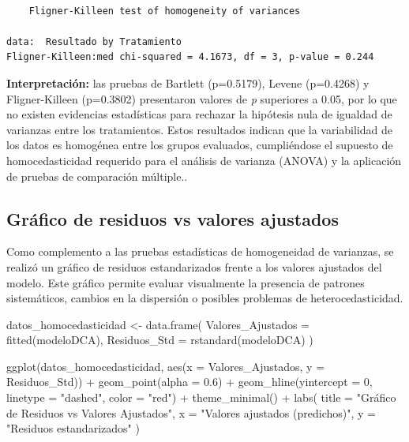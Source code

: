 \documentclass[
  spanish,
  letterpaper,
  DIV=11,
  numbers=noendperiod]{scrreprt}
\newenvironment{Shaded}{\begin{snugshade}}{\end{snugshade}}
\newcommand{\AttributeTok}[1]{\textcolor[rgb]{0.40,0.45,0.13}{#1}}
\newcommand{\DecValTok}[1]{\textcolor[rgb]{0.68,0.00,0.00}{#1}}
\newcommand{\FloatTok}[1]{\textcolor[rgb]{0.68,0.00,0.00}{#1}}
\newcommand{\FunctionTok}[1]{\textcolor[rgb]{0.28,0.35,0.67}{#1}}
\newcommand{\NormalTok}[1]{\textcolor[rgb]{0.00,0.23,0.31}{#1}}
\newcommand{\OtherTok}[1]{\textcolor[rgb]{0.00,0.23,0.31}{#1}}
\newcommand{\SpecialCharTok}[1]{\textcolor[rgb]{0.37,0.37,0.37}{#1}}
\newcommand{\StringTok}[1]{\textcolor[rgb]{0.13,0.47,0.30}{#1}}
\begin{document}
\begin{verbatim}

    Fligner-Killeen test of homogeneity of variances

data:  Resultado by Tratamiento
Fligner-Killeen:med chi-squared = 4.1673, df = 3, p-value = 0.244
\end{verbatim}

\textbf{Interpretación:} las pruebas de Bartlett (p=0.5179), Levene
(p=0.4268) y Fligner-Killeen (p=0.3802) presentaron valores de \emph{p}
superiores a 0.05, por lo que no existen evidencias estadísticas para
rechazar la hipótesis nula de igualdad de varianzas entre los
tratamientos. Estos resultados indican que la variabilidad de los datos
es homogénea entre los grupos evaluados, cumpliéndose el supuesto de
homocedasticidad requerido para el análisis de varianza (ANOVA) y la
aplicación de pruebas de comparación múltiple..

\subsection{Gráfico de residuos vs valores
ajustados}\label{gruxe1fico-de-residuos-vs-valores-ajustados}

Como complemento a las pruebas estadísticas de homogeneidad de
varianzas, se realizó un gráfico de residuos estandarizados frente a los
valores ajustados del modelo. Este gráfico permite evaluar visualmente
la presencia de patrones sistemáticos, cambios en la dispersión o
posibles problemas de heterocedasticidad.

\begin{Shaded}
\begin{Highlighting}[]
\NormalTok{datos\_homocedasticidad }\OtherTok{\textless{}{-}} \FunctionTok{data.frame}\NormalTok{(}
\AttributeTok{Valores\_Ajustados =} \FunctionTok{fitted}\NormalTok{(modeloDCA),}
\AttributeTok{Residuos\_Std =} \FunctionTok{rstandard}\NormalTok{(modeloDCA)}
\NormalTok{)}

\FunctionTok{ggplot}\NormalTok{(datos\_homocedasticidad, }\FunctionTok{aes}\NormalTok{(}\AttributeTok{x =}\NormalTok{ Valores\_Ajustados, }\AttributeTok{y =}\NormalTok{ Residuos\_Std)) }\SpecialCharTok{+}
\FunctionTok{geom\_point}\NormalTok{(}\AttributeTok{alpha =} \FloatTok{0.6}\NormalTok{) }\SpecialCharTok{+}
\FunctionTok{geom\_hline}\NormalTok{(}\AttributeTok{yintercept =} \DecValTok{0}\NormalTok{, }\AttributeTok{linetype =} \StringTok{"dashed"}\NormalTok{, }\AttributeTok{color =} \StringTok{"red"}\NormalTok{) }\SpecialCharTok{+}
\FunctionTok{theme\_minimal}\NormalTok{() }\SpecialCharTok{+}
\FunctionTok{labs}\NormalTok{(}
\AttributeTok{title =} \StringTok{"Gráfico de Residuos vs Valores Ajustados"}\NormalTok{,}
\AttributeTok{x =} \StringTok{"Valores ajustados (predichos)"}\NormalTok{,}
\AttributeTok{y =} \StringTok{"Residuos estandarizados"}
\NormalTok{)}
\end{Highlighting}
\end{Shaded}
\end{document}
